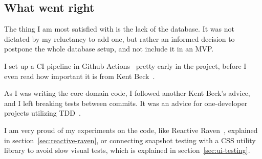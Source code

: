 \subsection{What went right}\label{sec:what-went-right}

The thing I am most satisfied with
is the lack of the database.
It was not dictated by my reluctancy to add one,
but rather an informed decision
to postpone the whole database setup,
and not include it in an MVP.

I set up a CI pipeline
in Github Actions~\cite{github_inc_github_2022-1}
pretty early in the project,
before I even read how important it is
from Kent Beck~\cite{beck_extreme_2004}.

As I was writing the core domain code,
I followed another Kent Beck's advice,
and I left breaking tests between commits.
It was an advice for one-developer projects
utilizing TDD~\cite{beck_test-driven_2002}.

I am very proud of my experiments
on the code,
like Reactive Raven~\cite{sewera_reactive_2022},
explained in section~\ref{sec:reactive-raven},
or connecting snapshot testing
with a CSS utility library
to avoid slow visual tests,
which is explained in section~\ref{sec:ui-testing}.
